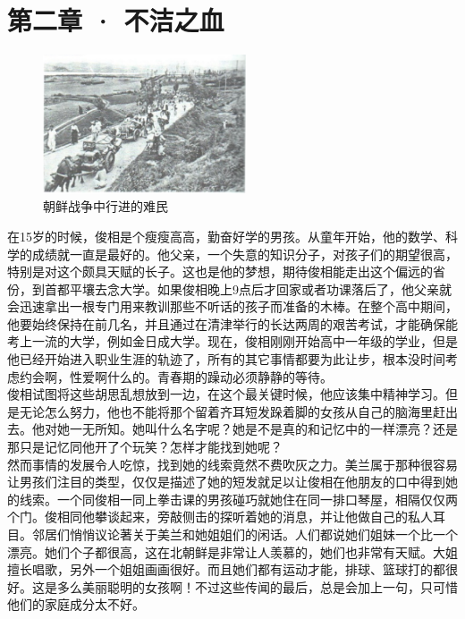 \fancyhead[RO]{\thepage}
\fancyhead[LE]{\thepage}
\fancyfoot[LE,RO]{}
\fancyfoot[LO,CE]{}
\fancyfoot[CO,RE]{}
\chapter*{第二章 · 不洁之血}
\begin{figure}[!htbp]
	\centering
	\includegraphics[width=6cm]{./Chapters/Images/02.jpg}
	\caption*{朝鲜战争中行进的难民}
\end{figure}


在15岁的时候，俊相是个瘦瘦高高，勤奋好学的男孩。从童年开始，他的数学、科学的成绩就一直是最好的。他父亲，一个失意的知识分子，对孩子们的期望很高，特别是对这个颇具天赋的长子。这也是他的梦想，期待俊相能走出这个偏远的省份，到首都平壤去念大学。如果俊相晚上9点后才回家或者功课落后了，他父亲就会迅速拿出一根专门用来教训那些不听话的孩子而准备的木棒。在整个高中期间，他要始终保持在前几名，并且通过在清津举行的长达两周的艰苦考试，才能确保能考上一流的大学，例如金日成大学。现在，俊相刚刚开始高中一年级的学业，但是他已经开始进入职业生涯的轨迹了，所有的其它事情都要为此让步，根本没时间考虑约会啊，性爱啊什么的。青春期的躁动必须静静的等待。\\

俊相试图将这些胡思乱想放到一边，在这个最关键时候，他应该集中精神学习。但是无论怎么努力，他也不能将那个留着齐耳短发跺着脚的女孩从自己的脑海里赶出去。他对她一无所知。她叫什么名字呢？她是不是真的和记忆中的一样漂亮？还是那只是记忆同他开了个玩笑？怎样才能找到她呢？\\

然而事情的发展令人吃惊，找到她的线索竟然不费吹灰之力。美兰属于那种很容易让男孩们注目的类型，仅仅是描述了她的短发就足以让俊相在他朋友的口中得到她的线索。一个同俊相一同上拳击课的男孩碰巧就她住在同一排口琴屋，相隔仅仅两个门。俊相同他攀谈起来，旁敲侧击的探听着她的消息，并让他做自己的私人耳目。邻居们悄悄议论著关于美兰和她姐姐们的闲话。人们都说她们姐妹一个比一个漂亮。她们个子都很高，这在北朝鲜是非常让人羡慕的，她们也非常有天赋。大姐擅长唱歌，另外一个姐姐画画很好。而且她们都有运动才能，排球、篮球打的都很好。这是多么美丽聪明的女孩啊！不过这些传闻的最后，总是会加上一句，只可惜他们的家庭成分太不好。\\

